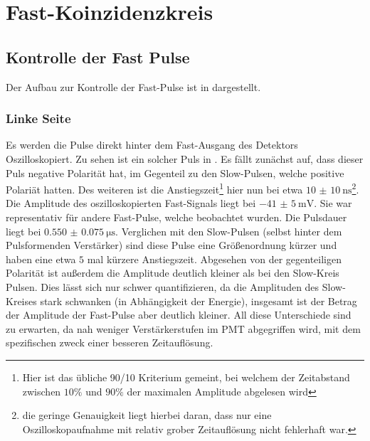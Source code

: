 \chapter{Fast-Koinzidenzkreis}




\section{Kontrolle der Fast Pulse}
Der Aufbau zur Kontrolle der Fast-Pulse ist in  dargestellt.


\subsection*{Linke Seite}

Es werden die Pulse direkt hinter dem Fast-Ausgang des Detektors Oszilloskopiert. Zu sehen ist ein solcher Puls in . Es fällt zunächst auf, dass dieser Puls negative Polarität hat, im Gegenteil zu den Slow-Pulsen, welche positive Polariät hatten. Des weiteren ist die Anstiegszeit\footnote{Hier ist das übliche 90/10 Kriterium gemeint, bei welchem der Zeitabstand zwischen $10\%$ und $90\%$ der maximalen Amplitude abgelesen wird} hier nun bei etwa $\SI{10(10)}{\nano\second}$\footnote{die geringe Genauigkeit liegt hierbei daran, dass nur eine Oszilloskopaufnahme mit relativ grober Zeitauflösung nicht fehlerhaft war.}.
Die Amplitude des oszilloskopierten Fast-Signals liegt bei $\SI{-41(5)}{\milli\volt}$. Sie war representativ für andere Fast-Pulse, welche beobachtet wurden. Die Pulsdauer liegt bei $\SI{0.550(75)}{\micro\second}$. Verglichen mit den Slow-Pulsen (selbst hinter dem Pulsformenden Verstärker) sind diese Pulse eine Größenordnung kürzer und haben eine etwa $5$ mal kürzere Anstiegszeit. Abgesehen von der gegenteiligen Polarität ist außerdem die Amplitude deutlich kleiner als bei den Slow-Kreis Pulsen. Dies lässt sich nur schwer quantifizieren, da die Amplituden des Slow-Kreises stark schwanken (in Abhängigkeit der Energie), insgesamt ist der Betrag der Amplitude der Fast-Pulse aber deutlich kleiner. All diese Unterschiede sind zu erwarten, da nah weniger Verstärkerstufen im PMT abgegriffen wird, mit dem spezifischen zweck einer besseren Zeitauflösung.


